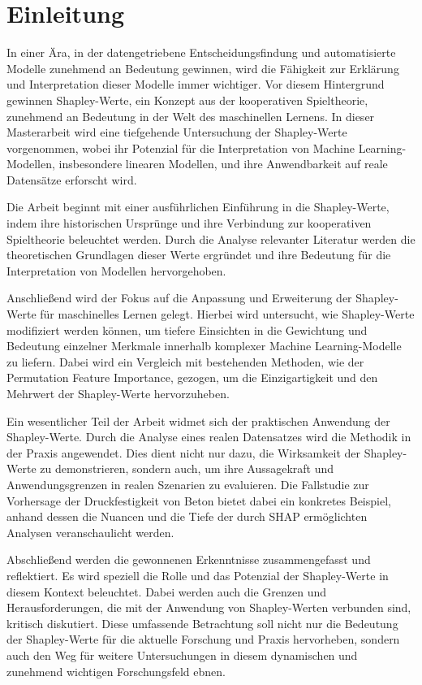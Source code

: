 \chapter{Einleitung}

In einer Ära, in der datengetriebene Entscheidungsfindung und automatisierte Modelle zunehmend an Bedeutung gewinnen, 
wird die Fähigkeit zur Erklärung und Interpretation dieser Modelle immer wichtiger. Vor diesem Hintergrund gewinnen 
Shapley-Werte, ein Konzept aus der kooperativen Spieltheorie, zunehmend an Bedeutung in der Welt des maschinellen Lernens. 
In dieser Masterarbeit wird eine tiefgehende Untersuchung der Shapley-Werte vorgenommen, wobei ihr Potenzial für die 
Interpretation von Machine Learning-Modellen, insbesondere linearen Modellen, und ihre Anwendbarkeit auf reale Datensätze 
erforscht wird.

Die Arbeit beginnt mit einer ausführlichen Einführung in die Shapley-Werte, indem ihre historischen Ursprünge 
und ihre Verbindung zur kooperativen Spieltheorie beleuchtet werden. Durch die Analyse relevanter Literatur 
werden die theoretischen Grundlagen dieser Werte ergründet und ihre Bedeutung für die Interpretation von Modellen hervorgehoben.

Anschließend wird der Fokus auf die Anpassung und Erweiterung der Shapley-Werte für maschinelles Lernen gelegt. 
Hierbei wird untersucht, wie Shapley-Werte modifiziert werden können, um tiefere Einsichten in die Gewichtung 
und Bedeutung einzelner Merkmale innerhalb komplexer Machine Learning-Modelle zu liefern. Dabei wird ein Vergleich 
mit bestehenden Methoden, wie der Permutation Feature Importance, gezogen, um die Einzigartigkeit und den Mehrwert der 
Shapley-Werte hervorzuheben.

Ein wesentlicher Teil der Arbeit widmet sich der praktischen Anwendung der Shapley-Werte. Durch die Analyse 
eines realen Datensatzes wird die Methodik in der Praxis angewendet. Dies dient nicht nur dazu, die Wirksamkeit 
der Shapley-Werte zu demonstrieren, sondern auch, um ihre Aussagekraft und Anwendungsgrenzen in realen Szenarien 
zu evaluieren. Die Fallstudie zur Vorhersage der Druckfestigkeit von Beton bietet dabei ein konkretes Beispiel, 
anhand dessen die Nuancen und die Tiefe der durch SHAP ermöglichten Analysen veranschaulicht werden.

Abschließend werden die gewonnenen Erkenntnisse zusammengefasst und reflektiert. Es wird speziell die Rolle und das 
Potenzial der Shapley-Werte in diesem Kontext beleuchtet. Dabei werden auch die Grenzen und Herausforderungen, 
die mit der Anwendung von Shapley-Werten verbunden sind, kritisch diskutiert. Diese umfassende Betrachtung soll 
nicht nur die Bedeutung der Shapley-Werte für die aktuelle Forschung und Praxis hervorheben, sondern auch den Weg 
für weitere Untersuchungen in diesem dynamischen und zunehmend wichtigen Forschungsfeld ebnen.